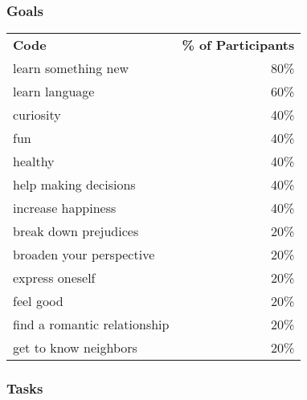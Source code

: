 \subsubsection*{Goals}

\begin{longtable}{p{}r}
\textbf{Code}                & \textbf{\% of Participants} \\
learn something new          & 80\%                        \\
learn language               & 60\%                        \\
curiosity                    & 40\%                        \\
fun                          & 40\%                        \\
healthy                      & 40\%                        \\
help making decisions        & 40\%                        \\
increase happiness           & 40\%                        \\
break down prejudices        & 20\%                        \\
broaden your perspective     & 20\%                        \\
express oneself              & 20\%                        \\
feel good                    & 20\%                        \\
find a romantic relationship & 20\%                        \\
get to know neighbors        & 20\%
\end{longtable}

\subsubsection*{Tasks}

